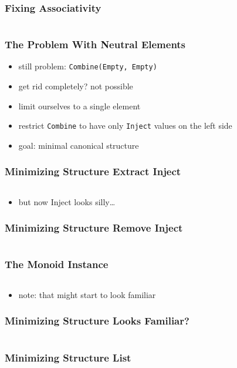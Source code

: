 \documentclass{beamer}
\begin{document}
\begin{frame}
  \frametitle{Fixing Associativity}
  \inputminted[highlightlines={11,13,7}, highlightcolor=yellow!40]{scala}{snippets/free-monoid-2.scala}
\end{frame}

\begin{frame}
  \frametitle{The Problem With Neutral Elements}
  \begin{itemize}
  \item still problem: \texttt{Combine(Empty, Empty)}
  \item get rid completely? not possible
  \item limit ourselves to a single element
  \item restrict \texttt{Combine} to have only \texttt{Inject} values on the left side
  \item goal: minimal canonical structure
  \end{itemize}
\end{frame}

\begin{frame}
  \frametitle{Minimizing Structure \textemdash{} Extract Inject}
  \inputminted[highlightlines={1, 7}, highlightcolor=yellow!40]{scala}{snippets/free-monoid-3.scala}
  \begin{itemize}
  \item but now Inject looks silly\ldots
  \end{itemize}
\end{frame}

\begin{frame}
  \frametitle{Minimizing Structure \textemdash{} Remove Inject}
  \inputminted[highlightlines={5}, highlightcolor=yellow!40]{scala}{snippets/free-monoid-4.scala}
\end{frame}

\begin{frame}
  \frametitle{The Monoid Instance}
  \inputminted{scala}{snippets/free-monoid-instance.scala}
  \begin{itemize}
  \item note: that might start to look familiar
  \end{itemize}
\end{frame}

\begin{frame}
  \frametitle{Minimizing Structure \textemdash{} Looks Familiar?}
  \inputminted{scala}{snippets/free-monoid-4.scala}
\end{frame}

\begin{frame}
  \frametitle{Minimizing Structure \textemdash{} List}
  \inputminted{scala}{snippets/free-monoid-5.scala}
\end{frame}
\end{document}
